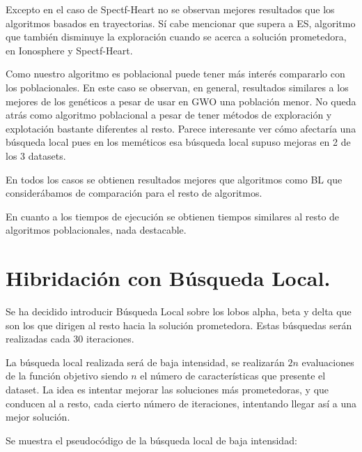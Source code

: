 \documentclass[11pt,a4paper]{article}
\theoremstyle{definition}
\begin{document}
	Excepto en el caso de Spectf-Heart no se observan mejores resultados que los algoritmos basados en trayectorias. Sí cabe mencionar que supera a ES, algoritmo que también disminuye la exploración cuando se acerca a solución prometedora, en Ionosphere y Spectf-Heart.
	
	Como nuestro algoritmo es poblacional puede tener más interés compararlo con los poblacionales. En este caso se observan, en general, resultados similares a los mejores de los genéticos a pesar de usar en GWO una población menor. No queda atrás como algoritmo poblacional a pesar de tener métodos de exploración y explotación bastante diferentes al resto. Parece interesante ver cómo afectaría una búsqueda local pues en los meméticos esa búsqueda local supuso mejoras en 2 de los 3 datasets.
	
	En todos los casos se obtienen resultados mejores que algoritmos como BL que considerábamos de comparación para el resto de algoritmos. 
	
	En cuanto a los tiempos de ejecución se obtienen tiempos similares al resto de algoritmos poblacionales, nada destacable.
	
	\section{Hibridación con Búsqueda Local.}
	Se ha decidido introducir Búsqueda Local sobre los lobos alpha, beta y delta que son los que dirigen al resto hacia la solución prometedora. Estas búsquedas serán realizadas cada 30 iteraciones.
	
	La búsqueda local realizada será de baja intensidad, se realizarán $2n$ evaluaciones de la función objetivo siendo $n$ el número de características que presente el dataset. La idea es intentar mejorar las soluciones más prometedoras, y que conducen al a resto, cada cierto número de iteraciones, intentando llegar así a una mejor solución.
	
	Se muestra el pseudocódigo de la búsqueda local de baja intensidad:\\
	
\end{document}
